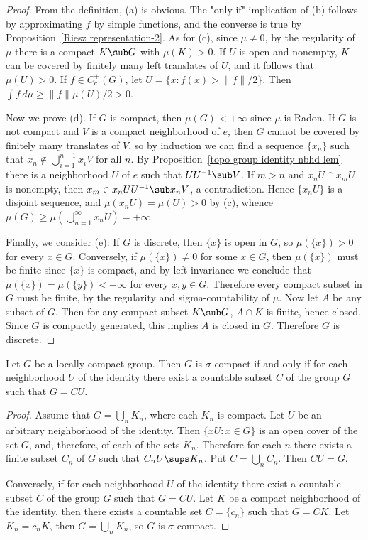 \begin{proof}
From the definition, (a) is obvious. The "only if" implication of (b) follows by approximating $f$ by simple functions, and the converse is true by Proposition~\ref{Riesz representation-2}. As for (c), since $\mu\neq 0$, by the regularity of $\mu$ there is a compact $K\sub G$ with $\mu(K)>0$. If $U$ is open and nonempty, $K$ can be covered by finitely many left translates of $U$, and it follows that $\mu(U)>0$. If $f\in C_c^+(G)$, let $U=\{x:f(x)>\|f\|/2\}$. Then $\int f\,d\mu\geq\|f\|\mu(U)/2>0$.\par
Now we prove (d). If $G$ is compact, then $\mu(G)<+\infty$ since $\mu$ is Radon. If $G$ is not compact and $V$ is a compact neighborhood of $e$, then $G$ cannot be covered by finitely many translates of $V$, so by induction we can find a sequence $\{x_n\}$ such that $x_n\notin\bigcup_{i=1}^{n-1}x_iV$ for all $n$. By Proposition~\ref{topo group identity nbhd lem} there is a neighborhood $U$ of $e$ such that $UU^{-1}\sub V$. If $m>n$ and $x_nU\cap x_mU$ is nonempty, then $x_m\in x_nUU^{-1}\sub x_nV$, a contradiction. Hence $\{x_nU\}$ is a disjoint sequence, and $\mu(x_nU)=\mu(U)>0$ by (c), whence $\mu(G)\geq\mu(\bigcup_{n=1}^{\infty}x_nU)=+\infty$.\par
Finally, we consider (e). If $G$ is discrete, then $\{x\}$ is open in $G$, so $\mu(\{x\})>0$ for every $x\in G$. Conversely, if $\mu(\{x\})\neq 0$ for some $x\in G$, then $\mu(\{x\})$ must be finite since $\{x\}$ is compact, and by left invariance we conclude that $\mu(\{x\})=\mu(\{y\})<+\infty$ for every $x,y\in G$. Therefore every compact subset in $G$ must be finite, by the regularity and sigma-countability of $\mu$. Now let $A$ be any subset of $G$. Then for any compact subset $K\sub G$, $A\cap K$ is finite, hence closed. Since $G$ is compactly generated, this implies $A$ is closed in $G$. Therefore $G$ is discrete.
\end{proof}
\begin{lemma}\label{LCH group sigma-compact iff}
Let $G$ be a locally compact group. Then $G$ is $\sigma$-compact if and only if for each neighborhood $U$ of the identity there exist a countable subset $C$ of the group $G$ such that $G=CU$.
\end{lemma}
\begin{proof}
Assume that $G=\bigcup_nK_n$, where each $K_n$ is compact. Let $U$ be an arbitrary neighborhood of the identity. Then $\{xU:x\in G\}$ is an open cover of the set $G$, and, therefore, of each of the sets $K_n$. Therefore for each $n$ there exists a finite subset $C_n$ of $G$ such that $C_nU\sups K_n$. Put $C=\bigcup_nC_n$. Then $CU=G$.\par
Conversely, if for each neighborhood $U$ of the identity there exist a countable subset $C$ of the group $G$ such that $G=CU$. Let $K$ be a compact neighborhood of the identity, then there exists a countable set $C=\{c_n\}$ such that $G=CK$. Let $K_n=c_nK$, then $G=\bigcup_nK_n$, so $G$ is $\sigma$-compact. 
\end{proof}
